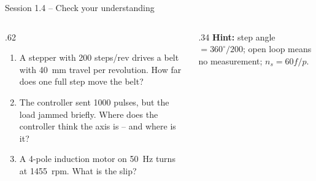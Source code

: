 \documentclass[aspectratio=169,10pt]{beamer}
\begin{document}
\begin{frame}{Session 1.4 -- Check your understanding}
\begin{columns}[T]
\begin{column}{.62\textwidth}
\begin{keybox}
\begin{enumerate}\setlength\itemsep{6pt}
\item A stepper with 200 steps/rev drives a belt with \SI{40}{\milli\metre} travel per revolution. How far does one full step move the belt?
\item The controller sent 1000 pulses, but the load jammed briefly. Where does the controller think the axis is -- and where is it?
\item A 4-pole induction motor on \SI{50}{\hertz} turns at \SI{1455}{rpm}. What is the slip?
\end{enumerate}
\end{keybox}
\end{column}
\begin{column}{.34\textwidth}
\small
\textbf{Hint:} step angle $=360^\circ/200$; open loop means no measurement; $n_s=60f/p$.
\end{column}
\end{columns}
\end{frame}
\end{document}
